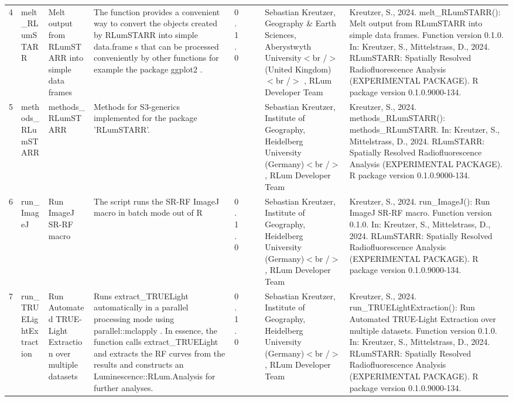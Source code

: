 \begin{table}[ht]
\begin{tabular}{rllllllll}
 \\ 
  4 & melt\_RLumSTARR & Melt output from RLumSTARR into simple data frames & The function provides a convenient way to convert the objects created by RLumSTARR into simple  data.frame s that can be processed conveniently by other functions for example the package  ggplot2 . & 0.1.0
 &  &  & Sebastian Kreutzer, Geography \& Earth Sciences, Aberystwyth University$<$br /$>$ (United Kingdom)$<$br /$>$ , RLum Developer Team & Kreutzer, S., 2024. melt\_RLumSTARR(): Melt output from RLumSTARR into simple data frames. Function version 0.1.0. In: Kreutzer, S., Mittelstrass, D., 2024. RLumSTARR: Spatially Resolved Radiofluorescence Analysis (EXPERIMENTAL PACKAGE). R package version 0.1.0.9000-134. 
 \\ 
  5 & methods\_RLumSTARR & methods\_RLumSTARR & Methods for S3-generics implemented for the package 'RLumSTARR'. &  &  &  & Sebastian Kreutzer, Institute of Geography, Heidelberg University (Germany)$<$br /$>$ , RLum Developer Team & Kreutzer, S., 2024. methods\_RLumSTARR(): methods\_RLumSTARR. In: Kreutzer, S., Mittelstrass, D., 2024. RLumSTARR: Spatially Resolved Radiofluorescence Analysis (EXPERIMENTAL PACKAGE). R package version 0.1.0.9000-134. 
 \\ 
  6 & run\_ImageJ & Run ImageJ SR-RF macro & The script runs the SR-RF ImageJ macro in batch mode out of R & 0.1.0
 &  &  & Sebastian Kreutzer, Institute of Geography, Heidelberg University (Germany)$<$br /$>$ , RLum Developer Team & Kreutzer, S., 2024. run\_ImageJ(): Run ImageJ SR-RF macro. Function version 0.1.0. In: Kreutzer, S., Mittelstrass, D., 2024. RLumSTARR: Spatially Resolved Radiofluorescence Analysis (EXPERIMENTAL PACKAGE). R package version 0.1.0.9000-134. 
 \\ 
  7 & run\_TRUELightExtraction & Run Automated TRUE-Light Extraction over multiple datasets & Runs  extract\_TRUELight  automatically in a parallel processing mode using  parallel::mclapply . In essence, the function calls  extract\_TRUELight  and extracts the RF curves from the results and constructs an  Luminescence::RLum.Analysis  for further analyses. & 0.1.0
 &  &  & Sebastian Kreutzer, Institute of Geography, Heidelberg University (Germany)$<$br /$>$ , RLum Developer Team & Kreutzer, S., 2024. run\_TRUELightExtraction(): Run Automated TRUE-Light Extraction over multiple datasets. Function version 0.1.0. In: Kreutzer, S., Mittelstrass, D., 2024. RLumSTARR: Spatially Resolved Radiofluorescence Analysis (EXPERIMENTAL PACKAGE). R package version 0.1.0.9000-134. 
 \\ 
   \hline
\end{tabular}
\end{table}

